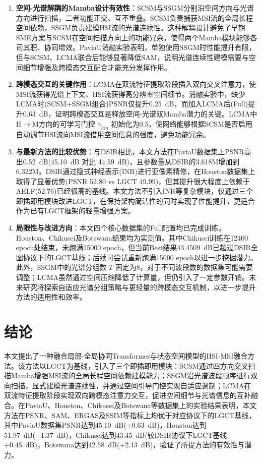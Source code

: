 \documentclass[UTF8,a4paper,11pt]{ctexart}
\begin{document}
\begin{enumerate}[label=\arabic*),leftmargin=2.2\ccwd,itemsep=3pt,topsep=3pt]
  \item \textbf{空间-光谱解耦的Mamba设计有效性}：SCSM与SSGM分别沿空间方向与光谱方向进行扫描，二者功能正交、互不重叠。SCSM负责捕获MSI流的全局长程空间依赖，SSGM负责建模HSI流的光谱连续性。这种解耦设计避免了早期SME方案与SCSM在空间扫描方向上的功能冗余，使得两个Mamba模块能够各司其职、协同增效。PaviaU消融实验表明，单独使用SSGM时性能提升有限，但与SCSM、LCMA联合后能够显著降低SAM，说明光谱连续性建模需要与空间细节增强及跨模态交互配合才能充分发挥作用。

  \item \textbf{跨模态交互的关键作用}：LCMA在双流特征提取阶段插入双向交叉注意力，使MSI流获得光谱上下文、HSI流获得高分辨率空间细节。消融实验中，缺少LCMA时(SCSM+SSGM组合)PSNR仅提升0.25~dB，而加入LCMA后(Full)提升0.63~dB，证明跨模态交互是释放空间-光谱双Mamba潜力的关键。LCMA中H$\rightarrow$M方向的可学习门控 $\gamma_{hm}$ 初始化为0.5，使网络能够根据SCSM是否启用自动调节HSI流向MSI流借用空间信息的强度，避免功能冗余。

  \item \textbf{与最新方法的比较优势}：与DSIR相比，本文方法在PaviaU数据集上PSNR高出0.52~dB(45.10~dB 对比 44.59~dB)，且参数量从DSIR的3.618M增加到6.322M。DSIR通过隐式神经表示(INR)进行亚像素精修，在Houston数据集上取得了显著优势(PSNR 52.80 vs LGCT 49.99)，但其提升很大程度上依赖于AELF(52.76)已经很高的基线。本文方法不引入INR等复杂模块，仅通过三个即插即用模块改进LGCT，在保持架构简洁性的同时实现了性能提升，更适合作为已有LGCT框架的轻量增强方案。

  \item \textbf{局限性与改进方向}：本文四个核心数据集的Full配置均已完成训练，Houston、Chikusei及Botswana结果均为实测值。其中Chikusei训练在12400 epoch处结束，未跑满15000 epoch，但当前Best结果43.4509~dB已超过DSIR全图协议下的LGCT基线；后续可尝试重新跑满15000 epoch以进一步挖掘潜力。此外，SSGM中的光谱分组数 $T$ 固定为8，对于不同波段数的数据集可能需要调整；LCMA虽然通过空间压缩降低了计算量，但仍引入了一定参数开销。未来研究将探索自适应光谱分组策略与更轻量的跨模态交互机制，以进一步提升方法的适用性和效率。
\end{enumerate}

\section{结论}
本文提出了一种融合局部-全局协同Transformer与状态空间模型的HSI-MSI融合方法。该方法以LGCT为基线，引入了三个即插即用模块：SCSM通过四方向交叉扫描Mamba增强MSI流的全局长程空间依赖建模能力；SSGM沿光谱波段顺序进行双向扫描，显式建模光谱连续性，并通过空间引导门控实现自适应调制；LCMA在双流特征提取阶段实现双向跨模态注意力交互，促进空间细节与光谱信息的互补融合。在PaviaU、Houston、Chikusei及Botswana等数据集上的实验结果表明，本文方法在PSNR、SAM、ERGAS及SSIM等指标上均优于对应协议下的LGCT基线，其中PaviaU数据集PSNR达到45.10~dB(+0.63~dB)，Houston达到51.97~dB(+1.37~dB)，Chikusei达到43.45~dB(较DSIR协议下LGCT基线+0.45~dB)，Botswana达到42.58~dB(+2.13~dB)，验证了所提方法的有效性与潜力。
\end{document}
